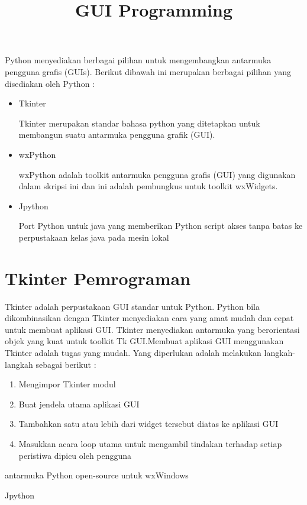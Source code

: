 \documentclass [12pt,a4paper,notitlepage,oneside,bahasa]{article}
\begin{document}
\title{\textbf GUI Programming}
\maketitle


Python menyediakan berbagai pilihan untuk mengembangkan antarmuka pengguna grafis (GUIs). 
Berikut dibawah ini merupakan berbagai pilihan yang disediakan oleh Python :
\begin{itemize}
\item Tkinter \par
Tkinter merupakan standar bahasa python yang ditetapkan untuk membangun suatu antarmuka pengguna grafik (GUI). 
\item wxPython \par
wxPython adalah toolkit antarmuka pengguna grafis (GUI) yang digunakan dalam skripsi ini dan ini adalah pembungkus untuk toolkit wxWidgets.
\item Jpython \par
Port Python untuk java yang memberikan Python script akses tanpa batas ke perpustakaan kelas java pada mesin lokal \par
\end{itemize}
\vspace{12pt}
\noindent 
\section{\textbf Tkinter Pemrograman}
Tkinter adalah perpustakaan GUI standar untuk Python. Python bila dikombinasikan dengan Tkinter menyediakan cara yang amat mudah dan cepat untuk membuat aplikasi GUI. Tkinter menyediakan antarmuka yang berorientasi objek yang kuat untuk toolkit Tk GUI.Membuat aplikasi GUI menggunakan Tkinter adalah tugas yang mudah. Yang diperlukan adalah melakukan langkah-langkah sebagai berikut : 
\begin{enumerate} 
	\item Mengimpor Tkinter modul 
	\item Buat jendela utama aplikasi GUI
	\item Tambahkan satu atau lebih dari widget tersebut diatas ke aplikasi GUI
	\item Masukkan acara loop utama untuk mengambil tindakan terhadap setiap peristiwa dipicu oleh pengguna
\end{enumerate}


antarmuka Python open-source untuk wxWindows 
 
\item Jpython 
\end{document}
